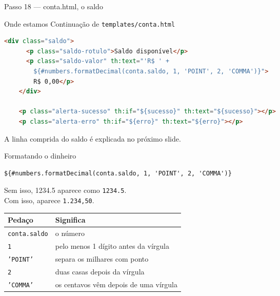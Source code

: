 \documentclass[aspectratio=169,11pt]{beamer}
\newcommand{\onde}[1]{%
  \begin{block}{Onde estamos}
    #1
  \end{block}
}
\begin{document}
\begin{frame}[fragile]{Passo 18 --- conta.html, o saldo}
  \onde{Continuação de \texttt{templates/conta.html}}

\begin{lstlisting}[language=HTML,basicstyle=\ttfamily\scriptsize]
    <div class="saldo">
      <p class="saldo-rotulo">Saldo disponível</p>
      <p class="saldo-valor" th:text="'R$ ' +
        ${#numbers.formatDecimal(conta.saldo, 1, 'POINT', 2, 'COMMA')}">
        R$ 0,00</p>
    </div>

    <p class="alerta-sucesso" th:if="${sucesso}" th:text="${sucesso}"></p>
    <p class="alerta-erro" th:if="${erro}" th:text="${erro}"></p>
\end{lstlisting}

  A linha comprida do saldo é explicada no próximo slide.
\end{frame}

\begin{frame}[fragile]{Formatando o dinheiro}
\begin{lstlisting}[basicstyle=\ttfamily\footnotesize]
${#numbers.formatDecimal(conta.saldo, 1, 'POINT', 2, 'COMMA')}
\end{lstlisting}

  \vspace{0.3em}
  Sem isso, 1234.5 aparece como \texttt{1234.5}.\\
  Com isso, aparece \texttt{1.234,50}.

  \vspace{0.4em}
  \begin{center}
  \begin{tabular}{ll}
    \toprule
    Pedaço & Significa \\
    \midrule
    \texttt{conta.saldo} & o número \\
    \texttt{1} & pelo menos 1 dígito antes da vírgula \\
    \texttt{'POINT'} & separa os milhares com ponto \\
    \texttt{2} & duas casas depois da vírgula \\
    \texttt{'COMMA'} & os centavos vêm depois de uma vírgula \\
    \bottomrule
  \end{tabular}
  \end{center}
\end{frame}
\end{document}

